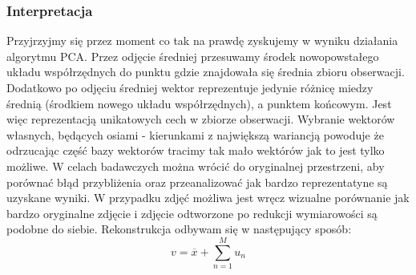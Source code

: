 \documentclass{article}
\begin{document}
\subsubsection{Interpretacja}
Przyjrzyjmy się przez moment co tak na prawdę zyskujemy w wyniku działania algorytmu PCA. Przez odjęcie średniej przesuwamy środek nowopowstałego układu współrzędnych do punktu gdzie znajdowała się średnia zbioru obserwacji. Dodatkowo po odjęciu średniej wektor reprezentuje jedynie różnicę miedzy średnią (środkiem nowego układu współrzędnych), a punktem końcowym. Jest więc reprezentacją unikatowych cech w zbiorze obserwacji. Wybranie wektorów własnych, będących osiami - kierunkami z największą wariancją powoduje że odrzucając część bazy wektorów tracimy tak mało wektórów jak to jest tylko możliwe. W celach badawczych można wrócić do oryginalnej przestrzeni, aby porównać błąd przybliżenia oraz przeanalizować jak bardzo reprezentatyne są uzyskane wyniki. W przypadku zdjęć możliwa jest wręcz wizualne porównanie jak bardzo oryginalne zdjęcie i zdjęcie odtworzone po redukcji wymiarowości są podobne do siebie. Rekonstrukcja odbywam się w następujący sposób:
\begin{equation}
	v = \overline{x} + \sum_{n=1}^{M}u_n
\end{equation}
\end{document}
